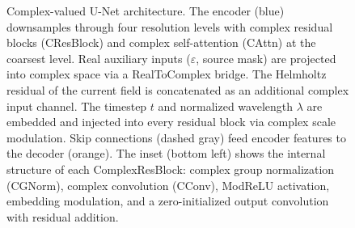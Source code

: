\begin{figure}[t]
\caption{Complex-valued U-Net architecture. The encoder (blue) downsamples through four resolution levels with complex
residual blocks (CResBlock) and complex self-attention (CAttn) at the coarsest level. Real auxiliary inputs
($\varepsilon$, source mask) are projected into complex space via a RealToComplex bridge. The Helmholtz residual of the
current field is concatenated as an additional complex input channel. The timestep $t$ and normalized wavelength
$\lambda$ are embedded and injected into every residual block via complex scale modulation. Skip connections (dashed
gray) feed encoder features to the decoder (orange). The inset (bottom left) shows the internal structure of each
ComplexResBlock: complex group normalization (CGNorm), complex convolution (CConv), ModReLU activation, embedding
modulation, and a zero-initialized output convolution with residual addition.}
\label{fig:architecture}
\end{figure}
